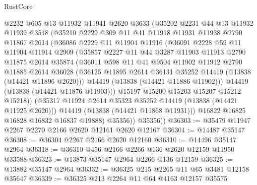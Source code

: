 \begin{lexlean}{RustCore}
\begin{coremodule}
            @2232
            @605
            @13
            @11932
            @11941
            @2620
            @3633
            (@35202
              @2231
              @44
              @13
              @11932
              @11939
              @3548
              (@35210
                @2229
                @309
                @11
                @41
                @11918
                @11931
                @11938
                @2790
                @11867
                @2614
                (@36086
                  @2229
                  @11
                  @11904
                  @11916
                  (@36091
                    @2228
                    @59
                    @11
                    @11904
                    @11914
                    @2909
                    (@35857
                      @2227
                      @11
                      @44
                      @3287
                      @11903
                      @11913
                      @2790
                      @11875
                      @2614
                      @35874
                      (@36011
                        @598
                        @11
                        @41
                        @9504
                        @11902
                        @11912
                        @2790
                        @11885
                        @2614
                        @36028
                        (@36125 @11895 @2614 @36131 @35252 @14419 (@13838 (@14421 @11896 @2620)))
                        @14419
                        (@13838 (@14421 @11886 @11902)))
                      @14419
                      (@13838 (@14421 @11876 @11903)))
                    @15197
                    @15200
                    @15203
                    @15207
                    @15212
                    @15218))
                (@35317 @11924 @2614 @35323 @35252 @14419 (@13838 (@14421 @11925 @2620)))
                @14419
                (@13838 (@14421 @11868 @11931)))
              @16822
              @16825
              @16828
              @16832
              @16837
              @19888)
            @35356))
        @35356))
@36303 := @35479 @11947 @2267 @2270 @2166 @2620 @12161 @2620 @12167
@36304 := @14487 @35147
@36308 := @36304 @2267 @2166 @2620 @12160
@36310 := @14496 @35147 @2964
@36318 := @36310 @456 @2166 @2266 @136 @2620 @12159 @11950 @33588
@36323 := @13873 @35147 @2964 @2266 @136 @12159
@36325 := @13882 @35147 @2964
@36332 := @36325 @215 @2265 @11 @65 @3481 @12158 @35647
@36339 := @36325 @213 @2264 @11 @64 @4163 @12157 @35575

\end{coremodule}
\end{lexlean}
